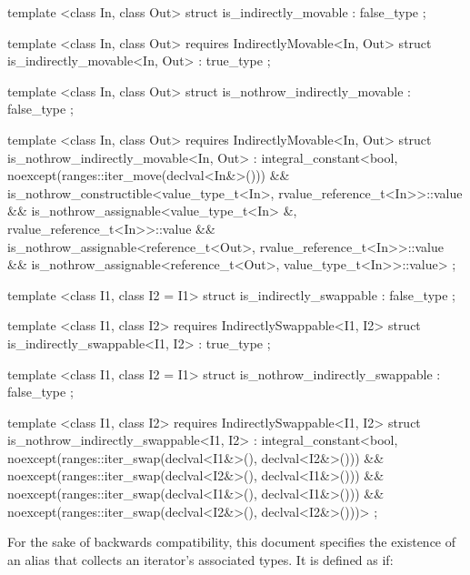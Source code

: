 \begin{codeblock}
template <class In, class Out>
struct is_indirectly_movable : false_type { };

template <class In, class Out>
  requires IndirectlyMovable<In, Out>
struct is_indirectly_movable<In, Out> : true_type { };

template <class In, class Out>
struct is_nothrow_indirectly_movable : false_type { };

template <class In, class Out>
  requires IndirectlyMovable<In, Out>
struct is_nothrow_indirectly_movable<In, Out> :
  integral_constant<bool,
    noexcept(ranges::iter_move(declval<In&>())) &&
    is_nothrow_constructible<value_type_t<In>, rvalue_reference_t<In>>::value &&
    is_nothrow_assignable<value_type_t<In> &, rvalue_reference_t<In>>::value &&
    is_nothrow_assignable<reference_t<Out>, rvalue_reference_t<In>>::value &&
    is_nothrow_assignable<reference_t<Out>, value_type_t<In>>::value>
{ };

template <class I1, class I2 = I1>
struct is_indirectly_swappable : false_type { };

template <class I1, class I2>
  requires IndirectlySwappable<I1, I2>
struct is_indirectly_swappable<I1, I2> : true_type { };

template <class I1, class I2 = I1>
struct is_nothrow_indirectly_swappable : false_type { };

template <class I1, class I2>
  requires IndirectlySwappable<I1, I2>
struct is_nothrow_indirectly_swappable<I1, I2> :
  integral_constant<bool,
    noexcept(ranges::iter_swap(declval<I1&>(), declval<I2&>())) &&
    noexcept(ranges::iter_swap(declval<I2&>(), declval<I1&>())) &&
    noexcept(ranges::iter_swap(declval<I1&>(), declval<I1&>())) &&
    noexcept(ranges::iter_swap(declval<I2&>(), declval<I2&>()))>
{ };
\end{codeblock}

\pnum
For the sake of backwards compatibility, this document specifies the existence of an 
alias that collects an iterator's associated types. It is defined as if:

